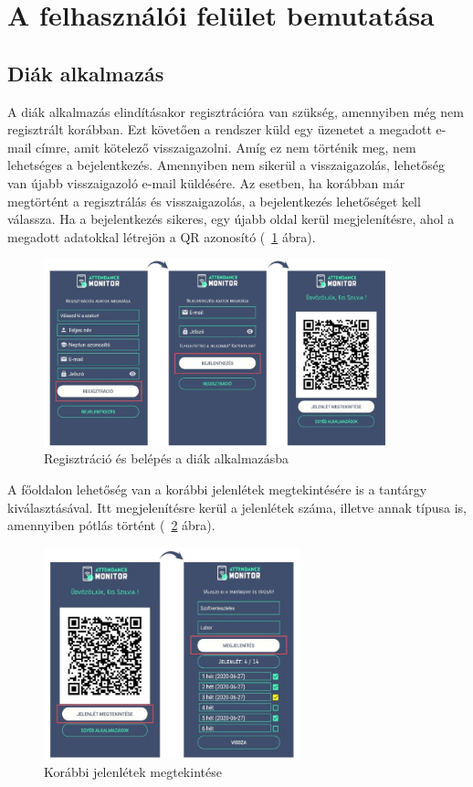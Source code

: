 \documentclass[12pt]{article}
\numberwithin{figure}{section}
\numberwithin{equation}{section}
\begin{document}
\hfill \break




\section{A felhasználói felület bemutatása}
\subsection{Diák alkalmazás}
A diák alkalmazás elindításakor regisztrációra van szükség, amennyiben még nem regisztrált korábban. Ezt követően a rendszer küld egy üzenetet a megadott e-mail címre, amit kötelező visszaigazolni. Amíg ez nem történik meg, nem lehetséges a bejelentkezés. Amennyiben nem sikerül a visszaigazolás, lehetőség van újabb visszaigazoló e-mail küldésére. Az esetben, ha korábban már megtörtént a regisztrálás és visszaigazolás, a bejelentkezés lehetőséget kell válassza. Ha a bejelentkezés sikeres, egy újabb oldal kerül megjelenítésre, ahol a megadott adatokkal létrejön a QR azonosító (~\ref{fig:s_1} ábra).\\

	\begin{figure}[H]
		\centering
		\includegraphics[width=380px]{s_1.jpg}
		\caption{Regisztráció és belépés a diák alkalmazásba}
		\label{fig:s_1}
	\end{figure}

\hfill \break
A főoldalon lehetőség van a korábbi jelenlétek megtekintésére is a tantárgy kiválasztásával. Itt megjelenítésre kerül a jelenlétek száma, illetve annak típusa is, amennyiben pótlás történt (~\ref{fig:s_2} ábra).

	\begin{figure}[H]
	\centering
	\includegraphics[width=280px]{s_2.jpg}
	\caption{Korábbi jelenlétek megtekintése}
	\label{fig:s_2}
\end{figure}
\end{document}
